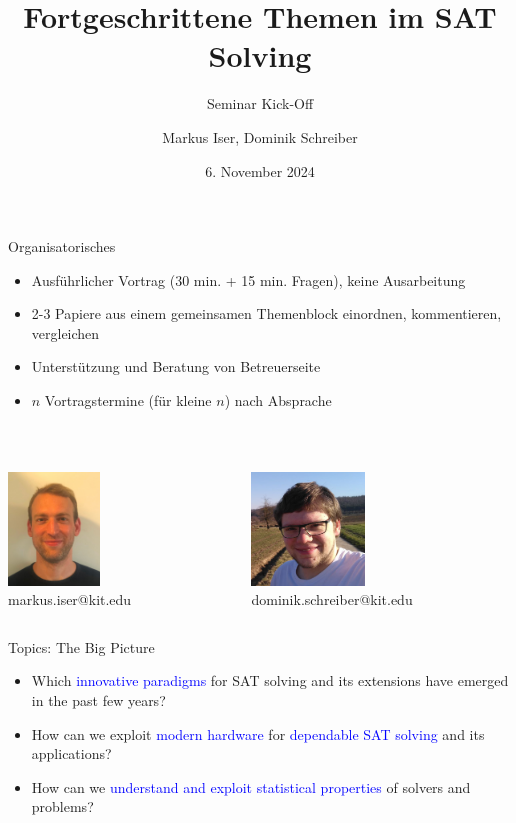 \documentclass[de]{sdqbeamer}
\title[SAT Seminar]{Fortgeschrittene Themen im SAT Solving}
\subtitle{Seminar Kick-Off}
\author[Iser, Schreiber]{Markus Iser, Dominik Schreiber}
\date[2024-11-06]{6. November 2024}
\newcommand{\highl}[1]{\textcolor{blue}{#1}}
\begin{document}
\KITtitleframe

\begin{frame}{Organisatorisches}
	\begin{itemize}
		\item Ausführlicher Vortrag (30 min. + 15 min. Fragen), keine Ausarbeitung
		\item 2-3 Papiere aus einem gemeinsamen Themenblock einordnen, kommentieren, vergleichen
		\item Unterstützung und Beratung von Betreuerseite
		\item $n$ Vortragstermine (für kleine $n$) nach Absprache
	\end{itemize}

\ 

	\begin{columns}
		\begin{column}{0.49\textwidth}
			\centering \includegraphics[height=3cm]{iser.jpg}\\
			markus.iser@kit.edu\\
			
		\end{column}
		\begin{column}{0.49\textwidth}
			\centering \includegraphics[height=3cm]{schreiber.png}\\
			dominik.schreiber@kit.edu
		\end{column}
	\end{columns}
\end{frame}

\begin{frame}{Topics: The Big Picture}
	\begin{itemize}
		\item Which \highl{innovative paradigms} for SAT solving and its extensions have emerged in the past few years?
		\item How can we exploit \highl{modern hardware} for \highl{dependable SAT solving} and its applications?
		\item How can we \highl{understand and exploit statistical properties} of solvers and problems?
	\end{itemize}
\end{frame}
\end{document}
